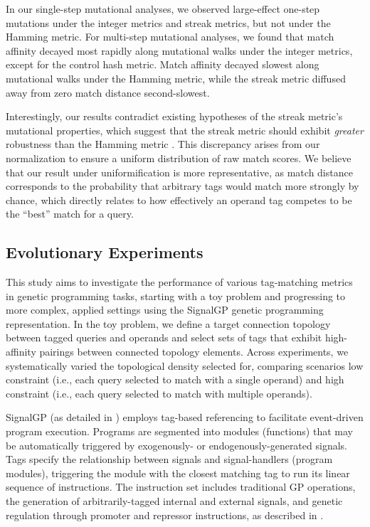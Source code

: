 In our single-step mutational analyses, we observed large-effect one-step mutations under the integer metrics and streak metrics, but not under the Hamming metric.
For multi-step mutational analyses, we found that match affinity decayed most rapidly along mutational walks under the integer metrics, except for the control hash metric.
Match affinity decayed slowest along mutational walks under the Hamming metric, while the streak metric diffused away from zero match distance second-slowest.

Interestingly, our results contradict existing hypotheses of the streak metric's mutational properties, which suggest that the streak metric should exhibit \textit{greater} robustness than the Hamming metric \citep{downing2015intelligence}.
This discrepancy arises from our normalization to ensure a uniform distribution of raw match scores.
We believe that our result under uniformification is more representative, as match distance corresponds to the probability that arbitrary tags would match more strongly by chance, which directly relates to how effectively an operand tag competes to be the ``best'' match for a query.

\subsection{Evolutionary Experiments}

This study aims to investigate the performance of various tag-matching metrics in genetic programming tasks, starting with a toy problem and progressing to more complex, applied settings using the SignalGP genetic programming representation.
In the toy problem, we define a target connection topology between tagged queries and operands and select sets of tags that exhibit high-affinity pairings between connected topology elements.
Across experiments, we systematically varied the topological density selected for, comparing scenarios low constraint (i.e., each query selected to match with a single operand) and high constraint (i.e., each query selected to match with multiple operands).

SignalGP (as detailed in \cite{lalejini2018evolving}) employs tag-based referencing to facilitate event-driven program execution. Programs are segmented into modules (functions) that may be automatically triggered by exogenously- or endogenously-generated signals.
Tags specify the relationship between signals and signal-handlers (program modules), triggering the module with the closest matching tag to run its linear sequence of instructions.
The instruction set includes traditional GP operations, the generation of arbitrarily-tagged internal and external signals, and genetic regulation through promoter and repressor instructions, as described in \cite{lalejini2021tag}.

